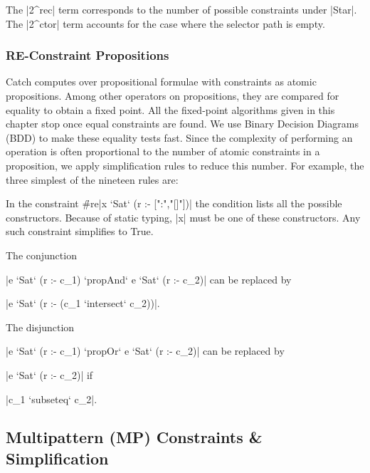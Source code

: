 The |2^rec| term corresponds to the number of possible constraints under |Star|. The |2^ctor| term accounts for the case where the selector path is empty.


\subsubsection{RE-Constraint Propositions}
\label{secC:re-propositions}

Catch computes over propositional formulae with constraints as atomic propositions. Among other operators on propositions, they are compared for equality to obtain a fixed point. All the fixed-point algorithms given in this chapter stop once equal constraints are found. We use Binary Decision Diagrams (BDD) \cite{lee:bdd} to make these equality tests fast. Since the complexity of performing an operation is often proportional to the number of atomic constraints in a proposition, we apply simplification rules to reduce this number. For example, the three  simplest of the nineteen rules are:

 In the constraint \h{#re}|x `Sat` (r :- [":","[]"])| the condition lists all the possible constructors. Because of static typing, |x| must be one of these constructors. Any such constraint simplifies to True.

 The conjunction \ignore|e `Sat` (r :- c_1) `propAnd` e `Sat` (r :- c_2)| can be replaced by \ignore|e `Sat` (r :- (c_1 `intersect` c_2))|.

 The disjunction \ignore|e `Sat` (r :- c_1) `propOr` e `Sat` (r :- c_2)| can be replaced by \ignore|e `Sat` (r :- c_2)| if \ignore|c_1 `subseteq` c_2|.


\subsection{Multipattern (MP) Constraints \& Simplification}
\label{secC:multipattern}

